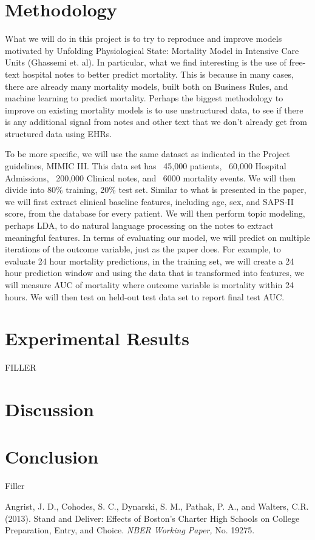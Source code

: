 \documentclass[12pt, final]{article}
\begin{document}
\section{Methodology}
\label{Methodology}

What we will do in this project is to try to reproduce and improve models motivated by Unfolding Physiological State: Mortality Model in Intensive Care Units (Ghassemi et. al). In particular, what we find interesting is the use of free-text hospital notes to better predict mortality. This is because in many cases, there are already many mortality models, built both on Business Rules, and machine learning to predict mortality. Perhaps the biggest methodology to improve on existing mortality models is to use unstructured data, to see if there is any additional signal from notes and other text that we don't already get from structured data using EHRs.

To be more specific, we will use the same dataset as indicated in the Project guidelines, MIMIC III. This data set has ~45,000 patients, ~60,000 Hospital Admissions, ~200,000 Clinical notes, and ~6000 mortality events. We will then divide into 80\% training, 20\% test set. Similar to what is presented in the paper, we will first extract clinical baseline features, including age, sex, and SAPS-II score, from the database for every patient. We will then perform topic modeling, perhaps LDA, to do natural language processing on the notes to extract meaningful features. In terms of evaluating our model, we will predict on multiple iterations of the outcome variable, just as the paper does. For example, to evaluate 24 hour mortality predictions, in the training set, we will create a 24 hour prediction window and using the data that is transformed into features, we will measure AUC of mortality where outcome variable is mortality within 24 hours. We will then test on held-out test data set to report final test AUC.

\section{Experimental Results}
\label{Experimental Results}
FILLER

\section{Discussion}
\label{Discussion}

\section{Conclusion}
\label{Conclusion}
Filler

  \begin{thebibliography}{1}
	 Angrist, J. D., Cohodes, S. C., Dynarski, S. M., Pathak, P. A., and Walters, C.R. (2013). Stand and Deliver: Effects of Boston's Charter High Schools on College Preparation, Entry, and Choice. {\em NBER Working Paper,} No. 19275. 
  
  \end{thebibliography}
\end{document}
